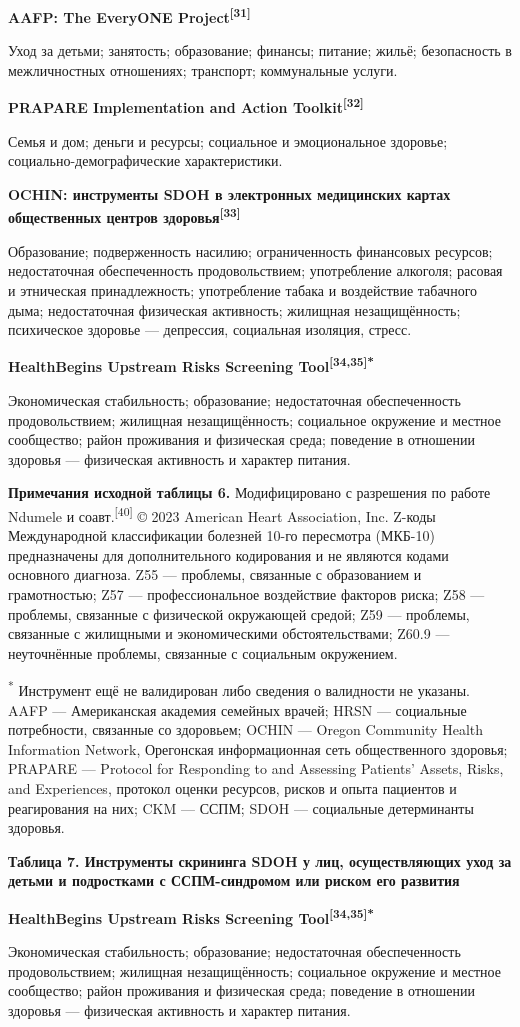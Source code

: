 \documentclass[11pt,a4paper]{article}
\newcommand{\src}[1]{\textsuperscript{[#1]}}
\newcommand{\heading}[1]{\par\medskip\textbf{#1}\par}
\begin{document}
\heading{AAFP: The EveryONE Project\src{31}}
Уход за детьми; занятость; образование; финансы; питание; жильё; безопасность в межличностных отношениях; транспорт; коммунальные услуги.

\heading{PRAPARE Implementation and Action Toolkit\src{32}}
Семья и дом; деньги и ресурсы; социальное и эмоциональное здоровье; социально-демографические характеристики.

\heading{OCHIN: инструменты SDOH в электронных медицинских картах общественных центров здоровья\src{33}}
Образование; подверженность насилию; ограниченность финансовых ресурсов; недостаточная обеспеченность продовольствием; употребление алкоголя; расовая и этническая принадлежность; употребление табака и воздействие табачного дыма; недостаточная физическая активность; жилищная незащищённость; психическое здоровье --- депрессия, социальная изоляция, стресс.

\heading{HealthBegins Upstream Risks Screening Tool\src{34,35}\textsuperscript{*}}
Экономическая стабильность; образование; недостаточная обеспеченность продовольствием; жилищная незащищённость; социальное окружение и местное сообщество; район проживания и физическая среда; поведение в отношении здоровья --- физическая активность и характер питания.

\textbf{Примечания исходной таблицы 6.} Модифицировано с разрешения по работе Ndumele и соавт.\src{40} © 2023 American Heart Association, Inc. Z-коды Международной классификации болезней 10-го пересмотра (МКБ-10) предназначены для дополнительного кодирования и не являются кодами основного диагноза. Z55 --- проблемы, связанные с образованием и грамотностью; Z57 --- профессиональное воздействие факторов риска; Z58 --- проблемы, связанные с физической окружающей средой; Z59 --- проблемы, связанные с жилищными и экономическими обстоятельствами; Z60.9 --- неуточнённые проблемы, связанные с социальным окружением.

\textsuperscript{*} Инструмент ещё не валидирован либо сведения о валидности не указаны. AAFP --- Американская академия семейных врачей; HRSN --- социальные потребности, связанные со здоровьем; OCHIN --- Oregon Community Health Information Network, Орегонская информационная сеть общественного здоровья; PRAPARE --- Protocol for Responding to and Assessing Patients' Assets, Risks, and Experiences, протокол оценки ресурсов, рисков и опыта пациентов и реагирования на них; CKM --- ССПМ; SDOH --- социальные детерминанты здоровья.

\heading{Таблица 7. Инструменты скрининга SDOH у лиц, осуществляющих уход за детьми и подростками с ССПМ-синдромом или риском его развития}
\heading{HealthBegins Upstream Risks Screening Tool\src{34,35}\textsuperscript{*}}
Экономическая стабильность; образование; недостаточная обеспеченность продовольствием; жилищная незащищённость; социальное окружение и местное сообщество; район проживания и физическая среда; поведение в отношении здоровья --- физическая активность и характер питания.
\end{document}
